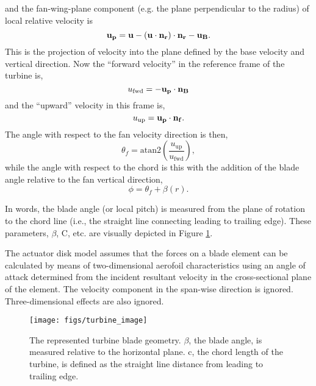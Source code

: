 and the fan-wing-plane component (e.g. the plane perpendicular to the 
radius) of local relative velocity is
\begin{equation}
{\bf u_p} = {\bf u} - ({\bf u}\cdot {\bf n_r})\cdot {\bf n_r} - {\bf u_B}. 
\end{equation}
This is the projection of velocity into the plane defined by the base
velocity and vertical direction. Now the ``forward velocity'' in the
reference frame of the turbine is,  
\begin{equation}
u_{\text{fwd}} = -{\bf u_p} \cdot {\bf n_B}
\end{equation}
and the ``upward'' velocity in this frame is, 
\begin{equation}
u_{\text{up}} = {\bf u_p} \cdot {\bf n_f}. 
\end{equation}
The angle with respect to the fan velocity direction is then, 
\begin{equation}
 \theta_f = \text{atan2}\left(\frac{ u_{\text{up} }}{
			 u_{\text{fwd}}}\right), 
  \label{eq:fan_direction}
\end{equation}
while the angle with respect to the chord is this with the addition of
the blade angle relative to the fan vertical direction, 
\begin{equation}
 \phi = \theta_f + \beta(r).
\end{equation}

In words, the blade angle (or local pitch) is measured from the plane of
rotation to the chord line (i.e., the straight line connecting leading
to trailing edge). These parameters, $\beta$, C, etc. are visually
depicted in Figure \ref{fig:turbine_image}.  

The actuator disk model assumes that the forces on a blade
element can be calculated by means of two-dimensional aerofoil
characteristics using an angle of attack determined from the incident
resultant velocity in the cross-sectional plane of the element. The
velocity component in the span-wise direction is
ignored. Three-dimensional effects are also
ignored\cite{burton2001wind}.  

  \begin{figure}[!htb]
    \begin{center}
     \texttt{[image: figs/turbine\_image]}
     \caption{The represented turbine blade
     geometry. $\beta$, the blade angle, is measured relative to the
     horizontal plane. c, the chord length of the turbine, is defined as
     the straight line distance from leading to trailing edge. } 
     \label{fig:turbine_image}
    \end{center}
  \end{figure}

